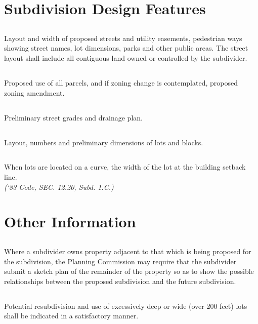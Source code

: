 \section{Subdivision Design Features}
\subsection{}
Layout and width of proposed streets and utility easements, pedestrian ways showing street names, lot dimensions, parks and other public areas. The street layout shall include all contiguous land owned or controlled by the subdivider.
\subsection{}
Proposed use of all parcels, and if zoning change is contemplated, proposed zoning amendment.
\subsection{}
Preliminary street grades and drainage plan.
\subsection{}
Layout, numbers and preliminary dimensions of lots and blocks.
\subsection{}
When lots are located on a curve, the width of the lot at the building setback line.\\
\emph{(‘83 Code, SEC. 12.20, Subd. 1.C.)}
\section{Other Information}
\subsection{}
Where a subdivider owns property adjacent to that which is being proposed for the subdivision, the Planning Commission may require that the subdivider submit a sketch plan of the remainder of the property so as to show the possible relationships between the proposed subdivision and the future subdivision.
\subsection{}
Potential resubdivision and use of excessively deep or wide (over 200 feet) lots shall be indicated in a satisfactory manner.
